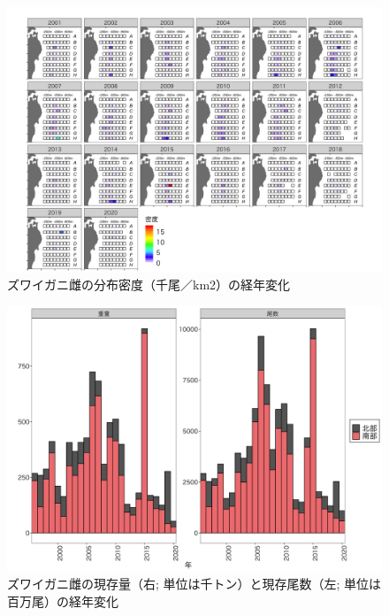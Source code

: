 \documentclass[11pt]{article} %
\begin{document}
\begin{linenumbers}
\begin{figure}[h]
  \centering
  \includegraphics[width = 14cm]{ズワイガニ雌dens.png}
  \caption{ズワイガニ雌の分布密度（千尾／km2）の経年変化}
\end{figure}

\begin{figure}[h]
  \centering
  \includegraphics[width = 14cm]{ズワイガニ雌trend.png}
  \caption{ズワイガニ雌の現存量（右; 単位は千トン）と現存尾数（左; 単位は百万尾）の経年変化}
\end{figure}


\end{linenumbers}
\end{document}
